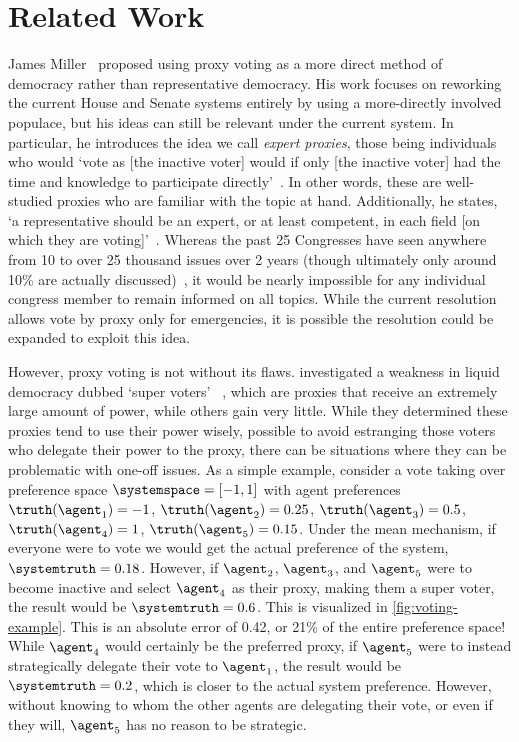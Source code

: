 \section{Related Work}\label{sec:related-work}
James Miller~\cite{Miller1969} proposed using proxy voting as a more direct
method of democracy rather than representative democracy.
His work focuses on reworking the current House and Senate systems entirely by using a
more-directly involved populace, but his ideas can still be relevant under the current
system.
In particular, he introduces the idea we call \textit{expert proxies},
those being individuals who would `vote as [the inactive voter] would if only
[the inactive voter] had the time and knowledge to participate
directly'~\cite[para.~1.3]{Miller1969}.
In other words, these are well-studied proxies who are familiar with the topic at hand.
Additionally, he states, `a representative should be an expert, or at least
competent, in each field [on which they are voting]'~\cite[para.~2.7]{Miller1969}.
Whereas the past 25 Congresses have seen anywhere from 10 to over 25 thousand issues
over 2 years (though ultimately only around 10\% are actually
discussed)~\cite{GovTrack2022}, it would be nearly impossible for any individual
congress member to remain informed on all topics.
While the current resolution allows vote by proxy only for emergencies, it is
possible the resolution could be expanded to exploit this idea.


However, proxy voting is not without its flaws.
 investigated a weakness in liquid democracy dubbed `super voters'
~\cite[para.~1.3]{Kling2015}, which are proxies that receive an extremely large
amount of power, while others gain very little.
While they determined these proxies tend to use their power wisely, possible to avoid
estranging those voters who delegate their power to the proxy, there can be
situations where they can be problematic with one-off issues.
As a simple example, consider a vote taking over preference
space $\systemspace = [-1, 1]$ with agent preferences $\truthof{\agent_1} = -1$,
$\truthof{\agent_2} = 0.25$, $\truthof{\agent_3} = 0.5$, $\truthof{\agent_4} = 1$,
$\truthof{\agent_5} = 0.15$.
Under the mean mechanism, if everyone were to vote
we would get the actual preference of the system, $\systemtruth = 0.18$.
However, if $\agent_2$, $\agent_3$, and $\agent_5$ were to become inactive and select
$\agent_4$ as their proxy, making them a super voter, the result would be
$\systemtruth = 0.6$.
This is visualized in \autoref{fig:voting-example}.
This is an absolute error of 0.42, or 21\% of the entire preference space!
While $\agent_4$ would certainly be the preferred proxy, if $\agent_5$ were to
instead strategically delegate their vote to $\agent_1$, the result would
be $\systemtruth = 0.2$, which is closer to the actual system preference.
However, without knowing to whom the other agents are delegating their vote, or even
if they will, $\agent_5$ has no reason to be strategic.

